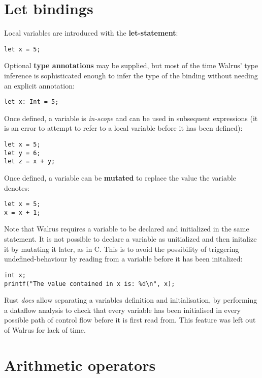\section{Let bindings}\label{section:reference:let_bindings}
Local variables are introduced with the \textbf{let-statement}:

\begin{verbatim}
let x = 5;
\end{verbatim}

Optional \textbf{type annotations} may be supplied, but most of the time
Walrus' type inference is sophisticated enough to infer the type of the binding
without needing an explicit annotation:
\begin{verbatim}
let x: Int = 5;
\end{verbatim}

Once defined, a variable is \textit{in-scope} and can be used in subsequent expressions
(it is an error to attempt to refer to a local variable before it has been defined):
\begin{verbatim}
let x = 5;
let y = 6;
let z = x + y;
\end{verbatim}

Once defined, a variable can be \textbf{mutated} to replace the value the variable
denotes:

\begin{verbatim}
let x = 5;
x = x + 1;
\end{verbatim}

Note that Walrus requires a variable to be declared and initialized in the same statement.
It is not possible to declare a variable as unitialized and then initalize it by mutating
it later, as in C. This is to avoid the possibility of triggering undefined-behaviour by
reading from a variable before it has been initalized:
\begin{verbatim}
int x;
printf("The value contained in x is: %d\n", x);
\end{verbatim}

Rust \textit{does} allow separating a variables definition and initialisation, by performing
a dataflow analysis to check that every variable has been initialised in every possible
path of control flow before it is first read from. This feature was left out of Walrus
for lack of time.


\section{Arithmetic operators}\label{section:reference:operators}
